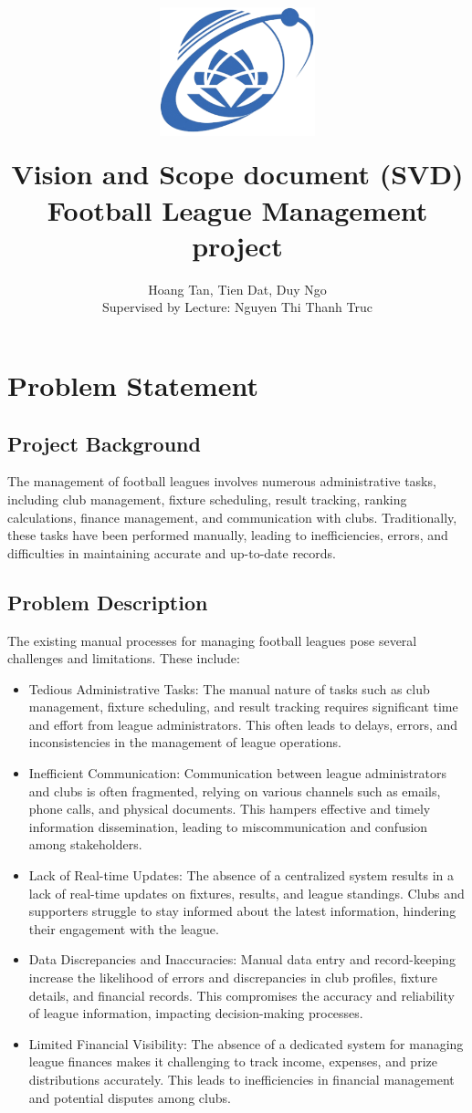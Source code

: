 \documentclass[12pt]{article}
\title{
{\includegraphics[width=4.5cm, height=4.5cm]{Figs/logo-uit-300x248.png}
}
\\
{Vision and Scope document (SVD) \\ Football League Management project}
}
\author{Hoang Tan, Tien Dat, Duy Ngo \\ Supervised by Lecture: Nguyen Thi Thanh Truc }
\begin{document}
\maketitle
\tableofcontents
\section{Problem Statement}
\subsection{Project Background}
The management of football leagues involves numerous administrative tasks, including club management, fixture scheduling, result tracking, ranking calculations, finance management, and communication with clubs. Traditionally, these tasks have been performed manually, leading to inefficiencies, errors, and difficulties in maintaining accurate and up-to-date records.

\subsection{ Problem Description}
The existing manual processes for managing football leagues pose several challenges and limitations. These include:
\begin{itemize}
    \item Tedious Administrative Tasks: The manual nature of tasks such as club management, fixture scheduling, and result tracking requires significant time and effort from league administrators. This often leads to delays, errors, and inconsistencies in the management of league operations.

    \item Inefficient Communication: Communication between league administrators and clubs is often fragmented, relying on various channels such as emails, phone calls, and physical documents. This hampers effective and timely information dissemination, leading to miscommunication and confusion among stakeholders.

    \item Lack of Real-time Updates: The absence of a centralized system results in a lack of real-time updates on fixtures, results, and league standings. Clubs and supporters struggle to stay informed about the latest information, hindering their engagement with the league.

    \item Data Discrepancies and Inaccuracies: Manual data entry and record-keeping increase the likelihood of errors and discrepancies in club profiles, fixture details, and financial records. This compromises the accuracy and reliability of league information, impacting decision-making processes.

    \item Limited Financial Visibility: The absence of a dedicated system for managing league finances makes it challenging to track income, expenses, and prize distributions accurately. This leads to inefficiencies in financial management and potential disputes among clubs.
\end{itemize}
\end{document}
